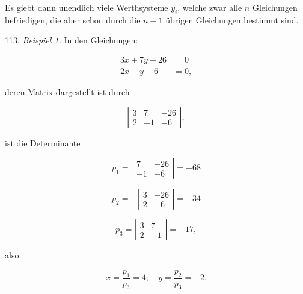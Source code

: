 \documentclass[11pt]{article}
\providecommand{\weberpage}[1]{}
\begin{document}
Es giebt dann unendlich viele Werthsysteme $y_i$, welche zwar alle $n$ Gleichungen befriedigen, die aber schon durch die $n-1$ übrigen Gleichungen bestimmt sind.

113. \textit{Beispiel 1.} In den Gleichungen:

\[ \begin{aligned} 3x+7y-26&=0\\ 2x-y-6&=0, \end{aligned} \]

deren Matrix dargestellt ist durch

\[ \left| \begin{array}{ccc} 3 & 7 & -26 \\ 2 & -1 & -6 \end{array} \right|, \]

ist die Determinante

\[ p_1 = \left| \begin{array}{cc} 7 & -26\\ -1 & -6 \end{array} \right| = -68 \]

\[ p_2 = -\left| \begin{array}{cc} 3 & -26\\ 2 & -6 \end{array} \right| = -34 \]

\[ p_3 = \left| \begin{array}{cc} 3 & 7\\ 2 & -1 \end{array} \right| = -17, \]

also:

\[ x=\frac{p_1}{p_3}=4;\quad y=\frac{p_2}{p_3}=+2. \]


\weberpage{119}
\end{document}
